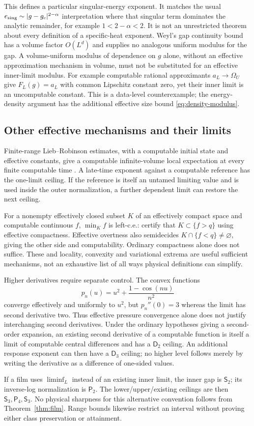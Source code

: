 This defines a particular singular-energy exponent. It matches the
usual $e_{\rm sing}\sim|g-g_c|^{2-\alpha}$ interpretation where that
singular term dominates the analytic remainder, for example
$1<2-\alpha<2$. It is not an unrestricted theorem about every
definition of a specific-heat exponent. Weyl's gap continuity bound
has a volume factor $O(L^d)$ and supplies no analogous uniform
modulus for the gap. A volume-uniform modulus of dependence on $g$
alone, without an effective approximation mechanism in volume,
must not be substituted for an effective inner-limit modulus.
For example computable rational approximants $a_L\to\Omega_U$
give $F_L(g)=a_L$ with common Lipschitz constant zero, yet their
inner limit is an uncomputable constant. This is a data-level
counterexample; the energy-density argument has the additional
effective size bound \eqref{eq:density-modulus}.

\subsection{Other effective mechanisms and their limits}
Finite-range Lieb--Robinson estimates, with a computable initial
state and effective constants, give a computable infinite-volume
local expectation at every finite computable time \cite{liebRobinson}.
A late-time exponent against a computable reference has the
one-limit ceiling. If the reference is itself an untamed limiting
value and is used inside the outer normalization, a further
dependent limit can restore the next ceiling.

For a nonempty effectively closed subset $K$ of an effectively
compact space and computable continuous $f$, $\min_K f$ is left-c.e.:
certify that $K\subset\{f>q\}$ using effective compactness.
Effective overtness also semidecides $K\cap\{f<q\}\ne\varnothing$,
giving the other side and computability. Ordinary compactness alone
does not suffice. These and locality, convexity and variational
extrema are useful sufficient mechanisms, not an exhaustive list
of all ways physical definitions can simplify.

Higher derivatives require separate control. The convex functions
\[
 p_n(u)=u^2+\frac{1-\cos(nu)}{n^2}
\]
converge effectively and uniformly to $u^2$, but $p_n''(0)=3$
whereas the limit has second derivative two. Thus effective pressure
convergence alone does not justify interchanging second derivatives.
Under the ordinary hypotheses giving a second-order expansion, an
existing second derivative of a computable function is itself a
limit of computable central differences and has a $\mathsf D_2$
ceiling. An additional response exponent can then have a
$\mathsf D_3$ ceiling; no higher level follows merely by writing
the derivative as a difference of one-sided values.

If a film uses $\liminf_L$ instead of an existing inner limit,
the inner gap is $\mathsf S_2$; its inverse-log normalization is
$\mathsf P_2$. The lower/upper/existing ceilings are then
$\mathsf S_3,\mathsf P_4,\mathsf S_3$. No physical sharpness for
this alternative convention follows from Theorem~\ref{thm:film}.
Range bounds likewise restrict an interval without proving either
class preservation or attainment.


